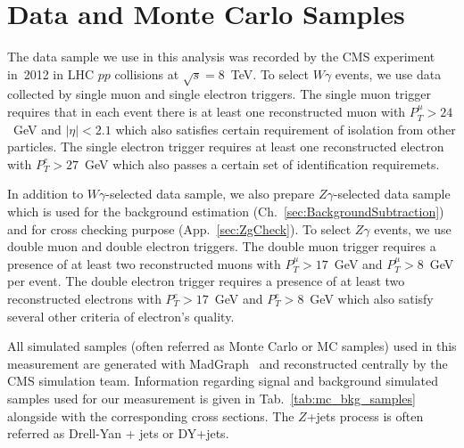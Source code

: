 \section{Data and Monte Carlo Samples}
\label{sec:DataAndMC}

The data sample we use in this analysis was recorded by the CMS experiment in~2012 in LHC $pp$ collisions at $\sqrt{s}=8$~TeV. To select $W\gamma$ events, we use data collected by single muon and single electron triggers. The single muon trigger requires that in each event there is at least one reconstructed muon with $P_T^{\mu}>24$~GeV and $|\eta|<2.1$ which also satisfies certain requirement of isolation from other particles. The single electron trigger requires at least one reconstructed electron with $P_T^{e}>27$~GeV which also passes a certain set of identification requiremets.

In addition to $W\gamma$-selected data sample, we also prepare $Z\gamma$-selected data sample which is used for the background estimation (Ch.~\ref{sec:BackgroundSubtraction}) and for cross checking purpose (App.~\ref{sec:ZgCheck}). To select $Z\gamma$ events, we use double muon and double electron triggers. The double muon trigger requires a presence of at least two reconstructed muons with $P_T^{\mu}>17$~GeV and $P_T^{\mu}>8$~GeV per event. The double electron trigger requires a presence of at least two reconstructed electrons with $P_T^{e}>17$~GeV and $P_T^{e}>8$~GeV which also satisfy several other criteria of electron's quality.





All simulated samples (often referred as Monte Carlo or MC samples) used in this measurement are generated with MadGraph~\cite{ref_MadGraph} and reconstructed centrally by the CMS simulation team. Information regarding signal and background simulated samples used for our measurement is given in Tab.~\ref{tab:mc_bkg_samples} alongside with the corresponding cross sections. The $Z$+jets process is often referred as Drell-Yan + jets or DY+jets.

